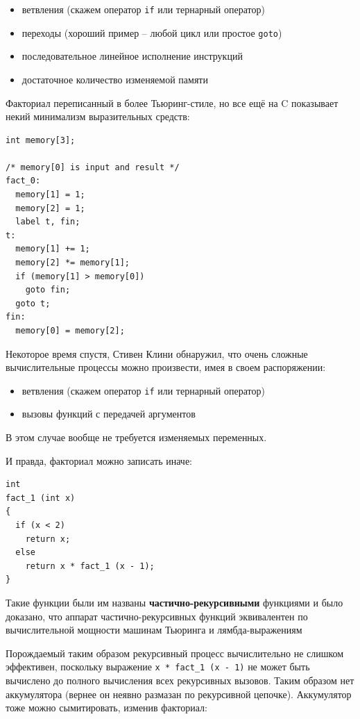 \documentclass[a4paper,12pt,oneside]{book}
\begin{document}
\begin{itemize}
\item ветвления (скажем оператор \lstinline!if! или тернарный оператор)
\item переходы (хороший пример -- любой цикл или простое \lstinline!goto!)
\item последовательное линейное исполнение инструкций
\item достаточное количество изменяемой памяти
\end{itemize}

Факториал переписанный в более Тьюринг-стиле, но все ещё на C показывает некий минимализм выразительных средств:

\begin{lstlisting}
int memory[3];

/* memory[0] is input and result */
fact_0:
  memory[1] = 1;
  memory[2] = 1;
  label t, fin;
t:
  memory[1] += 1;
  memory[2] *= memory[1];
  if (memory[1] > memory[0]) 
    goto fin;
  goto t;
fin:
  memory[0] = memory[2];
\end{lstlisting}

Некоторое время спустя, Стивен Клини обнаружил, что очень сложные вычислительные процессы можно произвести, имея в своем распоряжении:

\begin{itemize}
\item ветвления (скажем оператор \lstinline!if! или тернарный оператор)
\item вызовы функций с передачей аргументов
\end{itemize}

В этом случае вообще не требуется изменяемых переменных.

И правда, факториал можно записать иначе:

\begin{lstlisting}
int
fact_1 (int x)
{
  if (x < 2)
    return x;
  else
    return x * fact_1 (x - 1);
}
\end{lstlisting}

Такие функции были им названы \textbf{частично-рекурсивными} функциями и было доказано, что аппарат частично-рекурсивных функций эквивалентен по вычислительной мощности машинам Тьюринга и лямбда-выражениям

Порождаемый таким образом рекурсивный процесс вычислительно не слишком эффективен, поскольку выражение \lstinline!x * fact_1 (x - 1)! не может быть вычислено до полного вычисления всех рекурсивных вызовов. Таким образом нет аккумулятора (вернее он неявно размазан по рекурсивной цепочке). Аккумулятор тоже можно сымитировать, изменив факториал:
\end{document}
